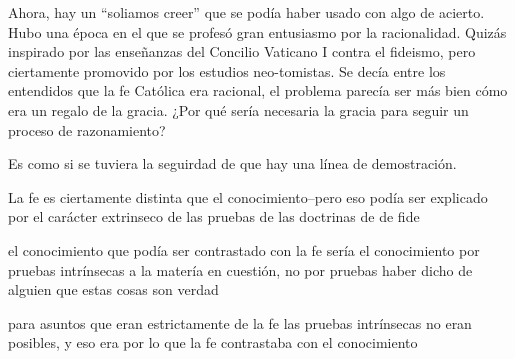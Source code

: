 Ahora, hay un ``soliamos creer'' que se podía haber usado con algo de acierto.
Hubo una época en el que se profesó gran entusiasmo por la racionalidad. Quizás
inspirado por las enseñanzas del Concilio Vaticano I contra el fideismo, pero
ciertamente promovido por los estudios neo-tomistas. Se decía entre los
entendidos que la fe Católica era racional, el problema parecía ser más bien
cómo era un regalo de la gracia. ¿Por qué sería necesaria la gracia para seguir
un proceso de razonamiento?

Es como si se tuviera la seguirdad de que hay una línea de demostración.

La fe es ciertamente distinta que el conocimiento--pero eso podía ser explicado
por el carácter extrinseco de las pruebas de las doctrinas de de fide

el conocimiento que podía ser contrastado con la fe sería el conocimiento por
pruebas intrínsecas a la matería en cuestión, no por pruebas haber dicho de
alguien que estas cosas son verdad

para asuntos que eran estrictamente de la fe las pruebas intrínsecas no eran
posibles, y eso era por lo que la fe contrastaba con el conocimiento
